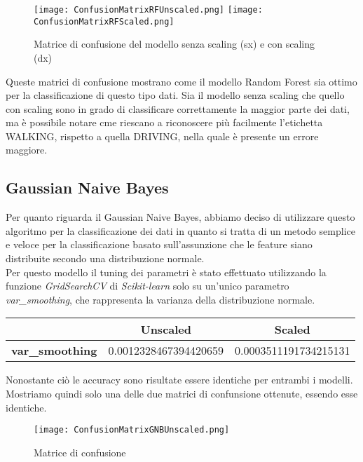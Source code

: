 \documentclass[../../Report.tex]{subfiles}
\begin{document}
\begin{figure}[H]
    \centering
    \texttt{[image: ConfusionMatrixRFUnscaled.png]}
    \texttt{[image: ConfusionMatrixRFScaled.png]}
    \caption{Matrice di confusione del modello senza scaling (sx) e con scaling (dx)}
    \label{fig:confusion_matrix_rf}
\end{figure}
Queste matrici di confusione mostrano come il modello Random Forest sia ottimo per la classificazione di questo tipo dati. Sia il modello senza scaling che quello con scaling sono in grado di classificare correttamente la maggior parte dei dati, ma è possibile notare cme riescano a riconoscere più facilmente l'etichetta WALKING, rispetto a quella DRIVING, nella quale è presente un errore maggiore. 
\subsection{Gaussian Naive Bayes}
Per quanto riguarda il Gaussian Naive Bayes, abbiamo deciso di utilizzare questo algoritmo per la classificazione dei dati in quanto si tratta di un metodo semplice e veloce per la classificazione basato sull'assunzione che le feature siano distribuite secondo una distribuzione normale.\\
Per questo modello il tuning dei parametri è stato effettuato utilizzando la funzione \emph{GridSearchCV} di \emph{Scikit-learn} solo su un'unico parametro \emph{var\_smoothing}, che rappresenta la varianza della distribuzione normale.\\
\begin{table}[H]
    \centering
    \begin{tabular}{|c|c|c|}
        \hline
        &\textbf{Unscaled}& \textbf{Scaled} \\
        \hline
        \textbf{var\_smoothing} & 0.0012328467394420659 & 0.0003511191734215131 \\
        \hline
    \end{tabular}
\end{table}
Nonostante ciò le accuracy sono risultate essere identiche per entrambi i modelli. Mostriamo quindi solo una delle due matrici di confunsione ottenute, essendo esse identiche.
\begin{figure}[H]
    \centering
    \texttt{[image: ConfusionMatrixGNBUnscaled.png]}
    \caption{Matrice di confusione }
    \label{fig:confusion_matrix_gaussian}
\end{figure}
\end{document}
